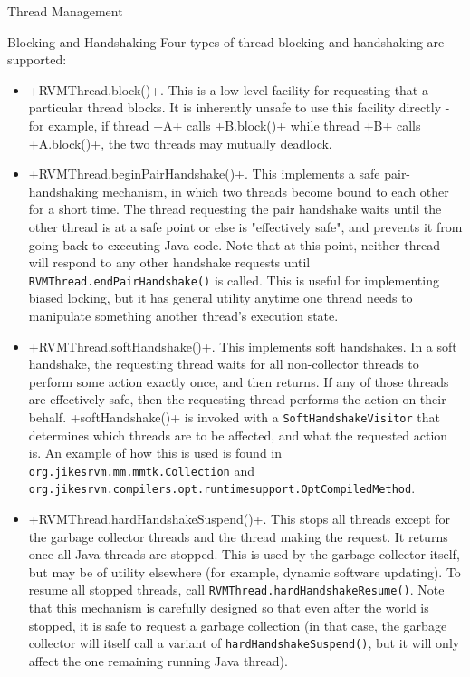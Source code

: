 \begin{section}{Thread Management}
\begin{subsection}{Blocking and Handshaking}
Four types of thread blocking and handshaking are supported:
\begin{itemize}
  \item \spverb+RVMThread.block()+. This is a low-level facility for requesting that a particular thread blocks. It is inherently unsafe to use this facility directly - for example, if thread \spverb+A+ calls \spverb+B.block()+ while thread \spverb+B+ calls \spverb+A.block()+, the two threads may mutually deadlock.
  \item \spverb+RVMThread.beginPairHandshake()+. This implements a safe pair\hyp handshaking mechanism, in which two threads become bound to each other for a short time. The thread requesting the pair handshake waits until the other thread is at a safe point or else is "effectively safe", and prevents it from going back to executing Java code. Note that at this point, neither thread will respond to any other handshake requests until \texttt{RVM\-Thread.end\-Pair\-Hand\-sha\-ke()} is called. This is useful for implementing biased locking, but it has general utility anytime one thread needs to manipulate something another thread's execution state.
  \item \spverb+RVMThread.softHandshake()+. This implements soft handshakes. In a soft handshake, the requesting thread waits for all non-collector threads to perform some action exactly once, and then returns. If any of those threads are effectively safe, then the requesting thread performs the action on their behalf. \spverb+softHandshake()+ is invoked with a \texttt{Soft\-Hand\-sha\-ke\-Vi\-si\-tor} that determines which threads are to be affected, and what the requested action is. An example of how this is used is found in \texttt{org.ji\-kes\-rvm.mm.mmtk.Col\-lec\-tion} and \texttt{org.ji\-kes\-rvm.com\-pi\-lers.opt.run\-ti\-me\-sup\-port.Opt\-Com\-pi\-led\-Me\-thod}.
  \item \spverb+RVMThread.hardHandshakeSuspend()+. This stops all threads except for the garbage collector threads and the thread making the request. It returns once all Java threads are stopped. This is used by the garbage collector itself, but may be of utility elsewhere (for example, dynamic software updating). To resume all stopped threads, call \texttt{RVM\-Thread.hard\-Hand\-sha\-ke\-Re\-su\-me()}. Note that this mechanism is carefully designed so that even after the world is stopped, it is safe to request a garbage collection (in that case, the garbage collector will itself call a variant of \texttt{hard\-Hand\-sha\-ke\-Sus\-pend()}, but it will only affect the one remaining running Java thread).
\end{itemize}


\end{subsection}
\end{section}
